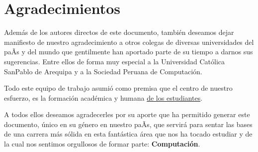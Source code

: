 \chapter*{Agradecimientos}\label{chap:cs-ack}
%

Además de los autores directos de este documento, también deseamos dejar manifiesto de nuestro 
agradecimiento a otros colegas de diversas universidades del paÃ­s y del mundo que gentilmente 
han aportado parte de su tiempo a darnos sus sugerencias. Entre ellos de forma muy especial a 
la Universidad Católica SanPablo de Arequipa y a la Sociedad Peruana de Computación.


Todo este equipo de trabajo asumió como premisa que el centro de nuestro esfuerzo, 
es la formación académica y humana \underline{de los estudiantes}.

A todos ellos deseamos agradecerles por su aporte que ha permitido generar 
este documento, único en su género en nuestro paÃ­s, que servirá para sentar las 
bases de una carrera más sólida en esta fantástica área que nos ha tocado estudiar y 
de la cual nos sentimos orgullosos de formar parte: \textbf{Computación}.
